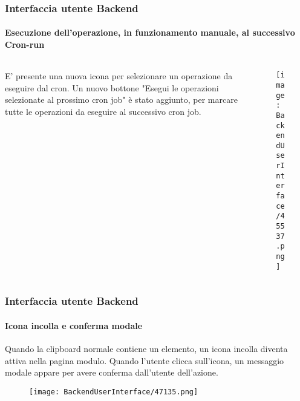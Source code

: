 \begin{frame}[fragile]
	\frametitle{Interfaccia utente Backend}
	\framesubtitle{Esecuzione dell'operazione, in funzionamento manuale, al successivo Cron-run}

	\begin{columns}[T]
		\begin{column}{0.35\textwidth}
			E' presente una nuova icona per selezionare un operazione da eseguire dal cron.
			Un nuovo bottone "Esegui le operazioni selezionate al prossimo cron job" è stato aggiunto, per
			marcare tutte le operazioni da eseguire al successivo cron job.
		\end{column}

		\begin{column}{0.65\textwidth}
			\begin{figure}\vspace{-0.6cm}
				\texttt{[image: BackendUserInterface/45537.png]}
			\end{figure}
		\end{column}
	\end{columns}

\end{frame}

\begin{frame}[fragile]
	\frametitle{Interfaccia utente Backend}
	\framesubtitle{Icona incolla e conferma modale}

	Quando la clipboard normale contiene un elemento, un icona incolla diventa attiva
	nella pagina modulo. Quando l'utente clicca sull'icona, un messaggio modale appare per 
	avere conferma dall'utente dell'azione.

	\begin{figure}\vspace{-0.2cm}
		\texttt{[image: BackendUserInterface/47135.png]}
	\end{figure}

\end{frame}

